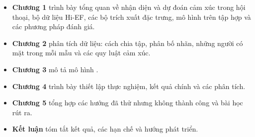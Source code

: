 \vspace{0.3cm}

\begin{itemize}
	\item \textbf{Chương 1} trình bày tổng quan về nhận diện và dự đoán cảm xúc trong hội thoại, bộ dữ liệu Hi-EF, các bộ trích xuất đặc trưng, mô hình trên tập hợp và các phương pháp đánh giá.
	\item \textbf{Chương 2} phân tích dữ liệu: cách chia tập, phân bố nhãn, những người có mặt trong mỗi mẫu và các quy luật cảm xúc.
	\item \textbf{Chương 3} mô tả mô hình \model{}.
	\item \textbf{Chương 4} trình bày thiết lập thực nghiệm, kết quả chính và các phân tích.
	\item \textbf{Chương 5} tổng hợp các hướng đã thử nhưng không thành công và bài học rút ra.
	\item \textbf{Kết luận} tóm tắt kết quả, các hạn chế và hướng phát triển.
\end{itemize}
